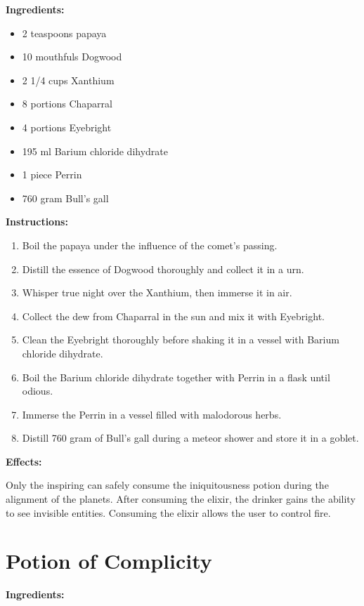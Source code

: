 \documentclass{article}
\begin{document}
\textbf{Ingredients:}

\begin{itemize}
  \item 2 teaspoons papaya
  \item 10 mouthfuls Dogwood
  \item 2 1/4 cups Xanthium
  \item 8 portions Chaparral
  \item 4 portions Eyebright
  \item 195 ml Barium chloride dihydrate
  \item 1 piece Perrin
  \item 760 gram Bull's gall
\end{itemize}

\textbf{Instructions:}

\begin{enumerate}
  \item Boil the papaya under the influence of the comet’s passing.
  \item Distill the essence of Dogwood thoroughly and collect it in a urn.
  \item Whisper true night over the Xanthium, then immerse it in air.
  \item Collect the dew from Chaparral in the sun and mix it with Eyebright.
  \item Clean the Eyebright thoroughly before shaking it in a vessel with Barium chloride dihydrate.
  \item Boil the Barium chloride dihydrate together with Perrin in a flask until odious.
  \item Immerse the Perrin in a vessel filled with malodorous herbs.
  \item Distill 760 gram of Bull's gall during a meteor shower and store it in a goblet.
\end{enumerate}

\textbf{Effects:}

Only the inspiring can safely consume the iniquitousness potion during the alignment of the planets. After consuming the elixir, the drinker gains the ability to see invisible entities. Consuming the elixir allows the user to control fire.

\newpage
\section*{Potion of Complicity}

\textbf{Ingredients:}
\end{document}
